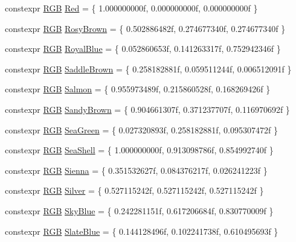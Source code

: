 \begin{DoxyCompactItemize}
\item 
constexpr \hyperlink{structmage_1_1_r_g_b}{R\+GB} \hyperlink{namespacemage_1_1color_a244419fcb8dc2b947e0c50af5fa4fb52}{Red} = \{ 1.\+000000000f, 0.\+000000000f, 0.\+000000000f \}
\item 
constexpr \hyperlink{structmage_1_1_r_g_b}{R\+GB} \hyperlink{namespacemage_1_1color_ad16b7dcec432fa50bcc5b1436122c7d4}{Rosy\+Brown} = \{ 0.\+502886482f, 0.\+274677340f, 0.\+274677340f \}
\item 
constexpr \hyperlink{structmage_1_1_r_g_b}{R\+GB} \hyperlink{namespacemage_1_1color_a9a5a96e06db610b817a28c688424f787}{Royal\+Blue} = \{ 0.\+052860653f, 0.\+141263317f, 0.\+752942346f \}
\item 
constexpr \hyperlink{structmage_1_1_r_g_b}{R\+GB} \hyperlink{namespacemage_1_1color_a86715103a7b44781b3193c280e61eac2}{Saddle\+Brown} = \{ 0.\+258182881f, 0.\+059511244f, 0.\+006512091f \}
\item 
constexpr \hyperlink{structmage_1_1_r_g_b}{R\+GB} \hyperlink{namespacemage_1_1color_a16d2bfe7068032f09cb8b8caeac239a8}{Salmon} = \{ 0.\+955973489f, 0.\+215860528f, 0.\+168269426f \}
\item 
constexpr \hyperlink{structmage_1_1_r_g_b}{R\+GB} \hyperlink{namespacemage_1_1color_a60814a5e21ce5f83b39a68435307ebac}{Sandy\+Brown} = \{ 0.\+904661307f, 0.\+371237707f, 0.\+116970692f \}
\item 
constexpr \hyperlink{structmage_1_1_r_g_b}{R\+GB} \hyperlink{namespacemage_1_1color_a20147160d6224370ec0022225c7b1b3f}{Sea\+Green} = \{ 0.\+027320893f, 0.\+258182881f, 0.\+095307472f \}
\item 
constexpr \hyperlink{structmage_1_1_r_g_b}{R\+GB} \hyperlink{namespacemage_1_1color_aa47be4b4b7553ee872d5593ce4312249}{Sea\+Shell} = \{ 1.\+000000000f, 0.\+913098786f, 0.\+854992740f \}
\item 
constexpr \hyperlink{structmage_1_1_r_g_b}{R\+GB} \hyperlink{namespacemage_1_1color_a5a0af07311915c908bfec906f104ce21}{Sienna} = \{ 0.\+351532627f, 0.\+084376217f, 0.\+026241223f \}
\item 
constexpr \hyperlink{structmage_1_1_r_g_b}{R\+GB} \hyperlink{namespacemage_1_1color_a3096a544f2ff01351f010eb5f36f27fa}{Silver} = \{ 0.\+527115242f, 0.\+527115242f, 0.\+527115242f \}
\item 
constexpr \hyperlink{structmage_1_1_r_g_b}{R\+GB} \hyperlink{namespacemage_1_1color_a339e4398bfd1cb4ac82f65578c9cfd1d}{Sky\+Blue} = \{ 0.\+242281151f, 0.\+617206684f, 0.\+830770009f \}
\item 
constexpr \hyperlink{structmage_1_1_r_g_b}{R\+GB} \hyperlink{namespacemage_1_1color_a0050809618b8a86850ccfee8b48e3d71}{Slate\+Blue} = \{ 0.\+144128496f, 0.\+102241738f, 0.\+610495693f \}

\end{DoxyCompactItemize}
